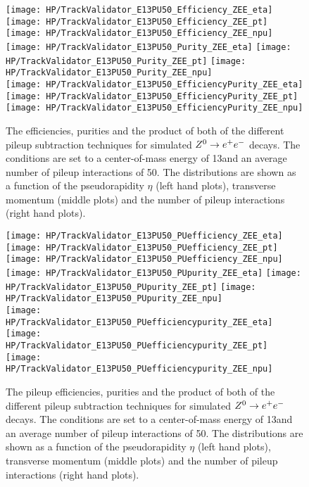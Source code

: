 \begin{figure}[!h]
  \centering
  \texttt{[image: HP/TrackValidator\_E13PU50\_Efficiency\_ZEE\_eta]}
  \texttt{[image: HP/TrackValidator\_E13PU50\_Efficiency\_ZEE\_pt]}
  \texttt{[image: HP/TrackValidator\_E13PU50\_Efficiency\_ZEE\_npu]}
   \\
  \texttt{[image: HP/TrackValidator\_E13PU50\_Purity\_ZEE\_eta]}
  \texttt{[image: HP/TrackValidator\_E13PU50\_Purity\_ZEE\_pt]}
  \texttt{[image: HP/TrackValidator\_E13PU50\_Purity\_ZEE\_npu]}
   \\
  \texttt{[image: HP/TrackValidator\_E13PU50\_EfficiencyPurity\_ZEE\_eta]}
  \texttt{[image: HP/TrackValidator\_E13PU50\_EfficiencyPurity\_ZEE\_pt]}
  \texttt{[image: HP/TrackValidator\_E13PU50\_EfficiencyPurity\_ZEE\_npu]}
  \caption[Efficiencies, purities and their product of the different pileup subtraction techniques for $\Zz\rightarrow\EE$ decays with 13\TeV and PU=50]{The efficiencies, purities and the product of both of the different pileup subtraction techniques for simulated $\Zz\rightarrow\EE$ decays. The conditions are set to a center-of-mass energy of 13\TeV and an average number of pileup interactions of 50. The distributions are shown as a function of the pseudorapidity $\eta$ (left hand plots), transverse momentum (middle plots) and the number of pileup interactions (right hand plots).}
\end{figure}
\clearpage

\begin{figure}[!h]
  \centering
  \texttt{[image: HP/TrackValidator\_E13PU50\_PUefficiency\_ZEE\_eta]}
  \texttt{[image: HP/TrackValidator\_E13PU50\_PUefficiency\_ZEE\_pt]}
  \texttt{[image: HP/TrackValidator\_E13PU50\_PUefficiency\_ZEE\_npu]}
   \\
  \texttt{[image: HP/TrackValidator\_E13PU50\_PUpurity\_ZEE\_eta]}
  \texttt{[image: HP/TrackValidator\_E13PU50\_PUpurity\_ZEE\_pt]}
  \texttt{[image: HP/TrackValidator\_E13PU50\_PUpurity\_ZEE\_npu]}
   \\
  \texttt{[image: HP/TrackValidator\_E13PU50\_PUefficiencypurity\_ZEE\_eta]}
  \texttt{[image: HP/TrackValidator\_E13PU50\_PUefficiencypurity\_ZEE\_pt]}
  \texttt{[image: HP/TrackValidator\_E13PU50\_PUefficiencypurity\_ZEE\_npu]}
  \caption[Pileup efficiencies, purities and their product of the different pileup subtraction techniques for $\Zz\rightarrow\EE$ decays with 13\TeV and PU=50]{The pileup efficiencies, purities and the product of both of the different pileup subtraction techniques for simulated $\Zz\rightarrow\EE$ decays. The conditions are set to a center-of-mass energy of 13\TeV and an average number of pileup interactions of 50. The distributions are shown as a function of the pseudorapidity $\eta$ (left hand plots), transverse momentum (middle plots) and the number of pileup interactions (right hand plots).}
\end{figure}
\clearpage

